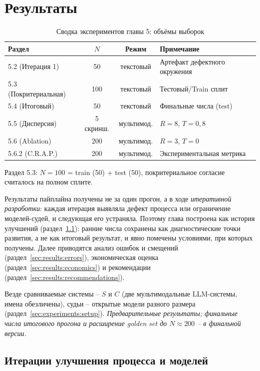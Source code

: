 \chapter{Результаты}
\label{sec:results}

\begin{table}[htbp]
\centering
\caption{Сводка экспериментов главы 5: объёмы выборок}
\label{tab:experiments-summary}
\begin{tabular}{lccp{4cm}}
\toprule
Раздел & $N$ & Режим & Примечание \\
\midrule
5.2 (Итерация 1) & 50 & текстовый & Артефакт дефектного окружения \\
5.3 (Покритериальная) & 100 & текстовый & Тестовый/Train сплит \\
5.4 (Итоговый) & 50 & текстовый & Финальные числа (test) \\
5.5 (Дисперсия) & 5 скринш. & мультимод. & $R=8$, $T=0{,}8$ \\
5.6 (Ablation) & 200 & мультимод. & $R=3$, $T=0$ \\
5.6.2 (C.R.A.P.) & 200 & мультимод. & Экспериментальная метрика \\
\bottomrule
\end{tabular}
\end{table}

\noindent\footnotesize Раздел 5.3: $N = 100$ = train (50) + test (50), покритериальное согласие считалось на полном сплите.\normalsize

Результаты пайплайна получены не за один прогон, а в ходе
\emph{итеративной разработки}: каждая итерация выявляла дефект процесса
или ограничение моделей-судей, и следующая его устраняла. Поэтому глава
построена как история улучшений (раздел~\ref{sec:results:iterations}):
ранние числа сохранены как диагностические точки развития, а не как
итоговый результат, и явно помечены условиями, при которых получены.
Далее приводятся анализ ошибок и смещений
(раздел~\ref{sec:results:errors}), экономическая оценка
(раздел~\ref{sec:results:economics}) и рекомендации
(раздел~\ref{sec:results:recommendations}).

Везде сравниваемые системы -- $S$ и $C$ (две мультимодальные LLM-системы,
имена обезличены), судьи -- открытые модели разного размера
(раздел~\ref{sec:experiments:setup}).
\emph{Предварительные результаты; финальные числа итогового прогона и
расширение golden set до $N \approx 200$ -- в финальной версии.}

\section{Итерации улучшения процесса и моделей}
\label{sec:results:iterations}

